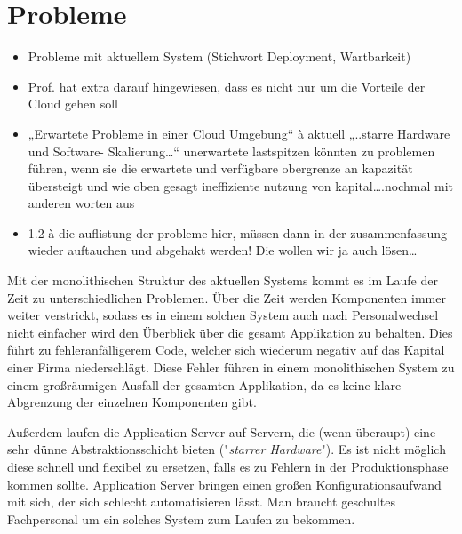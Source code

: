 

\section{Probleme}



\begin{itemize}
  \item Probleme mit aktuellem System (Stichwort Deployment, Wartbarkeit)
  \item Prof. hat extra darauf hingewiesen, dass es nicht nur um die Vorteile der Cloud gehen soll
  \item „Erwartete Probleme in einer Cloud Umgebung“ à aktuell „..starre Hardware und Software- Skalierung…“ unerwartete lastspitzen könnten zu problemen führen, wenn sie die erwartete und verfügbare obergrenze an kapazität übersteigt und wie oben gesagt ineffiziente nutzung von kapital….nochmal mit anderen worten aus 
  \item  1.2 à die auflistung der probleme hier, müssen dann in der zusammenfassung wieder auftauchen und abgehakt werden! Die wollen wir ja auch lösen…
\end{itemize}

Mit der monolithischen Struktur des aktuellen Systems kommt es im Laufe der Zeit zu unterschiedlichen Problemen. Über die Zeit werden Komponenten immer weiter verstrickt, sodass es in einem solchen System auch nach Personalwechsel nicht einfacher wird den Überblick über die gesamt Applikation zu behalten. Dies führt zu fehleranfälligerem Code, welcher sich wiederum negativ auf das Kapital einer Firma niederschlägt. Diese Fehler führen in einem monolithischen System zu einem großräumigen Ausfall der gesamten Applikation, da es keine klare Abgrenzung der einzelnen Komponenten gibt. 

Außerdem laufen die Application Server auf Servern, die (wenn überaupt) eine sehr dünne Abstraktionsschicht bieten ("\emph{starrer Hardware}"). Es ist nicht möglich diese schnell und flexibel zu ersetzen, falls es zu Fehlern in der Produktionsphase kommen sollte. Application Server bringen einen großen Konfigurationsaufwand mit sich, der sich schlecht automatisieren lässt. Man braucht geschultes Fachpersonal um ein solches System zum Laufen zu bekommen.

